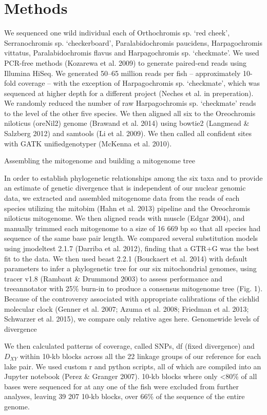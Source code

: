 \section{Methods}

We sequenced one wild individual each of Orthochromis sp. ‘red cheek’, Serranochromis sp. ‘checkerboard’, Paralabidochromis paucidens, Harpagochromis vittatus, Paralabidochromis flavus and Harpagochromis sp. ‘checkmate’. We used PCR-free methods (Kozarewa et al. 2009) to generate paired-end reads using Illumina HiSeq. We generated 50–65 million reads per fish – approximately 10-fold coverage – with the exception of Harpagochromis sp. ‘checkmate’, which was sequenced at higher depth for a different project (Neches et al. in preperation). We randomly reduced the number of raw Harpagochromis sp. ‘checkmate’ reads to the level of the other five species. We then aligned all six to the Oreochromis niloticus (oreNil2) genome (Brawand et al. 2014) using bowtie2 (Langmead & Salzberg 2012) and samtools (Li et al. 2009). We then called all confident sites with GATK unifiedgenotyper (McKenna et al. 2010).

Assembling the mitogenome and building a mitogenome tree

In order to establish phylogenetic relationships among the six taxa and to provide an estimate of genetic divergence that is independent of our nuclear genomic data, we extracted and assembled mitogenome data from the reads of each species utilizing the mitobim (Hahn et al. 2013) pipeline and the Oreochromis niloticus mitogenome. We then aligned reads with muscle (Edgar 2004), and manually trimmed each mitogenome to a size of 16 669 bp so that all species had sequence of the same base pair length. We compared several substitution models using jmodeltest 2.1.7 (Darriba et al. 2012), finding that a GTR+G was the best fit to the data. We then used beast 2.2.1 (Bouckaert et al. 2014) with default parameters to infer a phylogenetic tree for our six mitochondrial genomes, using tracer v1.8 (Rambaut & Drummond 2003) to assess performance and treeannotator with 25\% burn-in to produce a consensus mitogenome tree (Fig. 1). Because of the controversy associated with appropriate calibrations of the cichlid molecular clock (Genner et al. 2007; Azuma et al. 2008; Friedman et al. 2013; Schwarzer et al. 2015), we compare only relative ages here.
Genomewide levels of divergence

We then calculated patterns of coverage, called SNPs, df (fixed divergence) and $D_{XY}$ within 10-kb blocks across all the 22 linkage groups of our reference for each lake pair. We used custom r and python scripts, all of which are compiled into an Jupyter notebook (Perez & Granger 2007). 10-kb blocks where only <80\% of all bases were sequenced for at any one of the fish were excluded from further analyses, leaving 39 207 10-kb blocks, over 66\% of the sequence of the entire genome.

